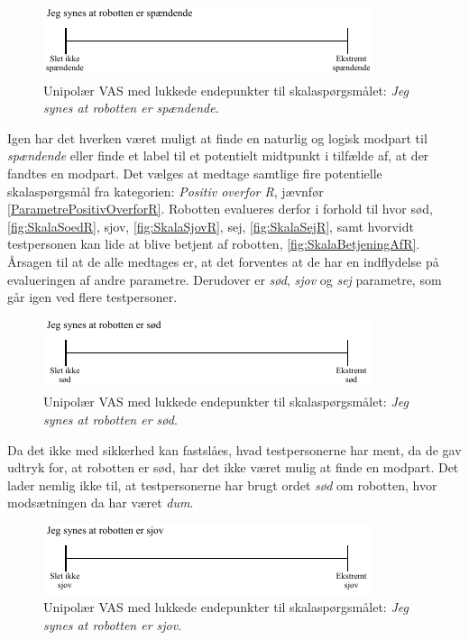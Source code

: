 \newpage
%
\begin{figure}[H]
\centering
\includegraphics[width =\textwidth]{Figure/UdvalgteSkalaer/RerSpaendende} 
\caption{Unipolær VAS med lukkede endepunkter til skalaspørgsmålet: \textit{Jeg synes at robotten er spændende}.}
\label{fig:SkalaRerSpaendende}
\end{figure}
\noindent
%
Igen har det hverken været muligt at finde en naturlig og logisk modpart til \textit{spændende} eller finde et label til et potentielt midtpunkt i tilfælde af, at der fandtes en modpart.\blankline 
%
Det vælges at medtage samtlige fire potentielle skalaspørgsmål fra kategorien: \textit{Positiv overfor R}, jævnfør \autoref{ParametrePositivOverforR}. Robotten evalueres derfor i forhold til hvor sød, \autoref{fig:SkalaSoedR}, sjov, \autoref{fig:SkalaSjovR}, sej, \autoref{fig:SkalaSejR}, samt hvorvidt testpersonen kan lide at blive betjent af robotten, \autoref{fig:SkalaBetjeningAfR}. Årsagen til at de alle medtages er, at det forventes at de har en indflydelse på evalueringen af andre parametre. Derudover er \textit{sød}, \textit{sjov} og \textit{sej} parametre, som går igen ved flere testpersoner. 
%
\begin{figure}[H]
\centering
\includegraphics[width =\textwidth]{Figure/UdvalgteSkalaer/SoedR} 
\caption{Unipolær VAS med lukkede endepunkter til skalaspørgsmålet: \textit{Jeg synes at robotten er sød}.}
\label{fig:SkalaSoedR}
\end{figure}
\noindent
%
Da det ikke med sikkerhed kan fastslåes, hvad testpersonerne har ment, da de gav udtryk for, at robotten er sød, har det ikke været mulig at finde en modpart. Det lader nemlig ikke til, at testpersonerne har brugt ordet \textit{sød} om robotten, hvor modsætningen da har været \textit{dum}.   
%
\begin{figure}[H]
\centering
\includegraphics[width =\textwidth]{Figure/UdvalgteSkalaer/SjovR} 
\caption{Unipolær VAS med lukkede endepunkter til skalaspørgsmålet: \textit{Jeg synes at robotten er sjov}.}
\label{fig:SkalaSjovR}
\end{figure}
